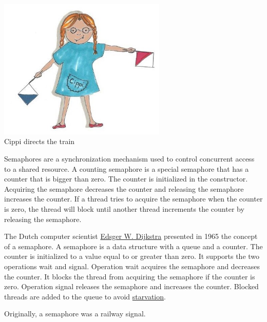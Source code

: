\begin{center}
\includegraphics[width=0.6\textwidth]{content/3/chapter6/images/15.png}\\
Cippi directs the train
\end{center}

Semaphores are a synchronization mechanism used to control concurrent access to a shared resource. A counting semaphore is a special semaphore that has a counter that is bigger than zero. The counter is initialized in the constructor. Acquiring the semaphore decreases the counter and releasing the semaphore increases the counter. If a thread tries to acquire the semaphore when the counter is zero, the thread will block until another thread increments the counter by releasing the semaphore.


\begin{tcolorbox}[colback=blue!5!white,colframe=blue!75!black,title={Edsger W. Dijkstra invented Semaphores}]
	
The Dutch computer scientist \href{https://en.wikipedia.org/wiki/Edsger_W._Dijkstra}{Edsger W. Dijkstra} presented in 1965 the concept of a semaphore. A semaphore is a data structure with a queue and a counter. The counter is initialized to a value equal to or greater than zero. It supports the two operations wait and signal. Operation wait acquires the semaphore and decreases the counter. It blocks the thread from acquiring the semaphore if the counter is zero. Operation signal releases the semaphore and increases the counter. Blocked threads are added to the queue to avoid \href{https://en.wikipedia.org/wiki/Starvation_(computer_science)}{starvation}.

Originally, a semaphore was a railway signal.
	
\end{tcolorbox}

